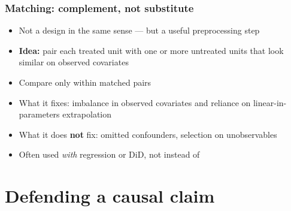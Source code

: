 \begin{frame}
\frametitle{Matching: complement, not substitute}
\centering

\begin{itemize}[<+->]
\item Not a design in the same sense --- but a useful preprocessing step
\item \textbf{Idea:} pair each treated unit with one or more untreated units that look similar on observed covariates
\item Compare only within matched pairs
\vspace{6pt}
\item What it fixes: imbalance in observed covariates and reliance on linear-in-parameters extrapolation
\item What it does \textbf{not} fix: omitted confounders, selection on unobservables
\vspace{6pt}
\item Often used \textit{with} regression or DiD, not instead of
\end{itemize}

\end{frame}

\section{Defending a causal claim}

